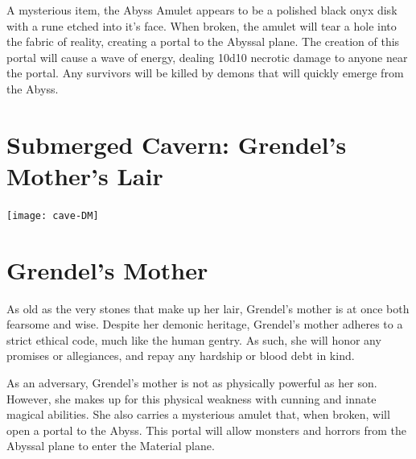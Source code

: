 \documentclass[10pt,twoside,twocolumn,openany]{book}
\begin{document}
A mysterious item, the Abyss Amulet appears to be a polished black onyx disk with a rune etched into it's face. When broken, the amulet will tear a hole into the fabric of reality, creating a portal to the Abyssal plane. The creation of this portal will cause a wave of energy, dealing 10d10 necrotic damage to anyone near the portal. Any survivors will be killed by demons that will quickly emerge from the Abyss.

\clearpage

\onecolumn
\section{Submerged Cavern: Grendel's Mother's Lair}
\texttt{[image: cave-DM]}
\twocolumn

\clearpage

\section{\textbf{Grendel's Mother}}
As old as the very stones that make up her lair, Grendel's mother is at once both fearsome and wise. Despite her demonic heritage, Grendel's mother adheres to a strict ethical code, much like the human gentry. As such, she will honor any promises or allegiances, and repay any hardship or blood debt in kind.

As an adversary, Grendel's mother is not as physically powerful as her son. However, she makes up for this physical weakness with cunning and innate magical abilities. She also carries a mysterious amulet that, when broken, will open a portal to the Abyss. This portal will allow monsters and horrors  from the Abyssal plane to enter the Material plane.

\vspace{2cm}
\end{document}
